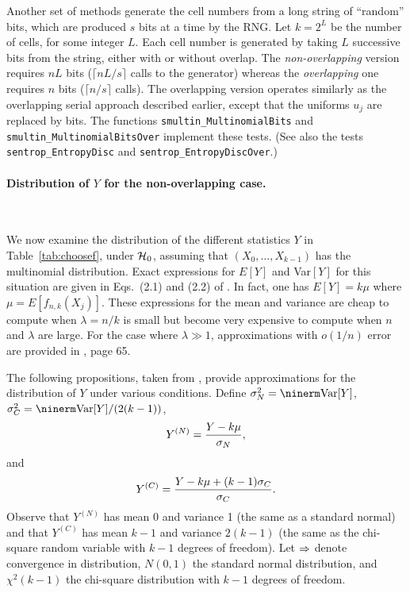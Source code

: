 Another set of methods generate the cell numbers from a long string
of ``random'' bits, which are produced $s$ bits at a time by the RNG.
Let $k = 2^L$ be the number of cells, for some integer $L$.
Each cell number is generated by taking $L$ successive bits from
the string, either with or without overlap.
The {\em non-overlapping\/} version requires $nL$ bits
($\lceil nL/s\rceil$ calls to the generator) whereas the
{\em overlapping\/} one requires $n$ bits ($\lceil n/s\rceil$ calls).
The overlapping version operates similarly as the overlapping serial
approach described earlier, except that the uniforms $u_j$ are replaced
by bits.
The functions {\tt smultin\_MultinomialBits} and
{\tt smultin\_MultinomialBitsOver} implement these tests.
(See also the tests
{\tt sentrop\_EntropyDisc} and {\tt sentrop\_EntropyDiscOver}.)

\paragraph*{Distribution of $Y$ for the non-overlapping case.} \

We now examine the distribution of the different statistics $Y$ in
Table~\ref{tab:choosef}, under $\mathcal{H}_0$, assuming that $(X_0,\dots,X_{k-1})$
has the multinomial distribution.
Exact expressions for $E[Y]$ and Var$[Y]$ for this situation are given
in Eqs.\ (2.1) and (2.2) of \cite{rLEC02c}.
In fact, one has $E[Y] = k\mu$ where $\mu = E[f_{n,k}(X_j)]$.
These expressions for the mean and variance are cheap to compute
when $\lambda = n/k$ is small
but become very expensive to compute when $n$ and $\lambda$ are large.
For the case where $\lambda \gg 1$, approximations with $o(1/n)$
error are provided in \cite{tREA88a}, page 65.

The following propositions, taken from \cite{rLEC02c}, provide
approximations for the distribution of $Y$ under various conditions.
Define $\sigma^2_N = \Var[Y]$, $\sigma^2_C = \Var[Y]/(2(k-1))$,
\[
  Y^{(N)} = {Y - k\mu \over \sigma_N},
\]
and
\[
  Y^{(C)} = {Y - k\mu + (k-1)\sigma_C\over\sigma_C}.
\]
Observe that $Y^{(N)}$ has mean 0 and variance 1 (the same as a
standard normal) and that $Y^{(C)}$ has mean $k-1$ and variance $2(k-1)$
(the same as the chi-square random variable with $k-1$ degrees of freedom).
Let $\Rightarrow$ denote convergence in distribution,
$N(0,1)$ the standard normal distribution, and $\chi^2(k-1)$
the chi-square distribution with $k-1$ degrees of freedom.

